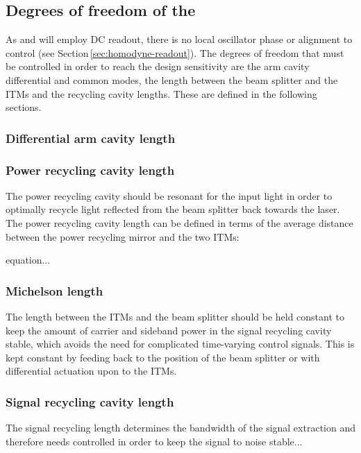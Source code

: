 \subsection{Degrees of freedom of the \DRFPMI{}}
As \ETLF{} and \ETHF{} will employ \gls{DC} readout, there is no local oscillator phase or alignment to control (see Section\,\ref{sec:homodyne-readout}). The degrees of freedom that must be controlled in order to reach the design sensitivity are the arm cavity differential and common modes, the length between the beam splitter and the \glspl{ITM} and the recycling cavity lengths. These are defined in the following sections.

\subsubsection{Differential arm cavity length}

\subsubsection{Power recycling cavity length}
The power recycling cavity should be resonant for the input light in order to optimally recycle light reflected from the beam splitter back towards the laser. The power recycling cavity length can be defined in terms of the average distance between the power recycling mirror and the two \glspl{ITM}:

equation...

\subsubsection{Michelson length}
The length between the \glspl{ITM} and the beam splitter should be held constant to keep the amount of carrier and sideband power in the signal recycling cavity stable, which avoids the need for complicated time-varying control signals. This is kept constant by feeding back to the position of the beam splitter or with differential actuation upon to the \glspl{ITM}.


\subsubsection{Signal recycling cavity length}
The signal recycling length determines the bandwidth of the signal extraction and therefore needs controlled in order to keep the signal to noise stable...

